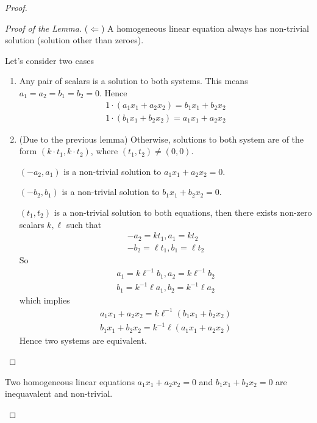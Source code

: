 \begin{proof}
\begin{proof}[Proof of the Lemma]
		($\Leftarrow$) A homogeneous linear equation always has non-trivial solution (solution other than zeroes).

		Let's consider two cases
		\begin{enumerate}[label = \textbf{Case \arabic*.}, itemindent=1cm]
			\item Any pair of scalars is a solution to both systems.
			      This means $a_{1} = a_{2} = b_{1} = b_{2} = 0$. Hence
			      \[
				      \begin{split}
					      1\cdot (a_{1}x_{1} + a_{2}x_{2}) = b_{1}x_{1} + b_{2}x_{2} \\
					      1\cdot (b_{1}x_{1} + b_{2}x_{2}) = a_{1}x_{1} + a_{2}x_{2}
				      \end{split}
			      \]
			\item (Due to the previous lemma) Otherwise, solutions to both system are of the form $(k\cdot t_{1}, k\cdot t_{2})$, where $(t_{1}, t_{2})\ne (0, 0)$.

			      $(-a_{2}, a_{1})$ is a non-trivial solution to $a_{1}x_{1} + a_{2}x_{2} = 0$.

			      $(-b_{2}, b_{1})$ is a non-trivial solution to $b_{1}x_{1} + b_{2}x_{2} = 0$.

			      $(t_{1}, t_{2})$ is a non-trivial solution to both equations, then there exists non-zero scalars $k, \ell$ such that
			      \[
				      \begin{split}
					      -a_{2} = kt_{1}, a_{1} = kt_{2} \\
					      -b_{2} = \ell t_{1}, b_{1} = \ell t_{2}
				      \end{split}
			      \]
			      So
			      \[
				      \begin{split}
					      a_{1} = k\ell^{-1}b_{1}, a_{2} = k\ell^{-1}b_{2} \\
					      b_{1} = k^{-1}\ell a_{1}, b_{2} = k^{-1}\ell a_{2}
				      \end{split}
			      \]
			      which implies
			      \[
				      \begin{split}
					      a_{1}x_{1} + a_{2}x_{2} = k\ell^{-1}(b_{1}x_{1} + b_{2}x_{2}) \\
					      b_{1}x_{1} + b_{2}x_{2} = k^{-1}\ell(a_{1}x_{1} + a_{2}x_{2})
				      \end{split}
			      \]
			      Hence two systems are equivalent.\qedhere
		\end{enumerate}
	\end{proof}

	\begin{lemma}\label{lemma:exercise:linear-combination-of-inequivalent-linear-equations}
		Two homogeneous linear equations $a_{1}x_{1} + a_{2}x_{2} = 0$ and $b_{1}x_{1} + b_{2}x_{2} = 0$ are inequavalent and non-trivial.


\end{lemma}
\end{proof}
